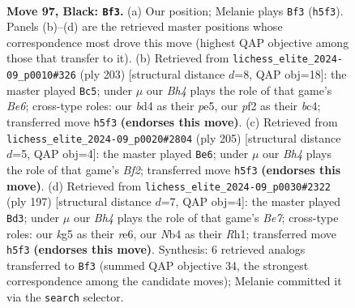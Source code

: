 \documentclass[11pt]{article}
\begin{document}
\clearpage

\begin{figure}[p]\centering
\begin{subfigure}{0.46\textwidth}\centering
\resizebox{\linewidth}{!}{%
\newchessgame
\chessboard[
  setfen={8/7k/8/6Kb/1n1B4/8/5P2/8 b - - 40 97},
  showmover=false,
  pgfstyle=straightmove, color=movearrow, markmove={h5-f3}
]}
\caption{}
\end{subfigure}\hfill
\begin{subfigure}{0.46\textwidth}\centering
\resizebox{\linewidth}{!}{%
\newchessgame
\chessboard[
  setfen={8/4k3/8/4P3/2B1K3/4b3/6P1/8 b - - 4 102},
  showmover=false,
  pgfstyle=straightmove, color=movearrow, markmove={e3-c5}
]}
\caption{}
\end{subfigure}
\\[4pt]
\begin{subfigure}{0.46\textwidth}\centering
\resizebox{\linewidth}{!}{%
\newchessgame
\chessboard[
  setfen={8/5b2/5P2/8/3B4/8/3k4/1K6 b - - 20 103},
  showmover=false,
  pgfstyle=straightmove, color=movearrow, markmove={f7-e6}
]}
\caption{}
\end{subfigure}\hfill
\begin{subfigure}{0.46\textwidth}\centering
\resizebox{\linewidth}{!}{%
\newchessgame
\chessboard[
  setfen={8/8/4R3/P1K3k1/8/2B5/4b3/7r b - - 48 99},
  showmover=false,
  pgfstyle=straightmove, color=movearrow, markmove={e2-d3}
]}
\caption{}
\end{subfigure}
\caption{\textbf{Move 97, Black: \texttt{Bf3}.} (a) Our position; Melanie plays \texttt{Bf3} (\texttt{h5f3}). Panels (b)--(d) are the retrieved master positions whose correspondence most drove this move (highest QAP objective among those that transfer to it). (b) Retrieved from \texttt{lichess\_elite\_2024-09\_p0010\#326} (ply 203) [structural distance $d$=8, QAP obj=18]: the master played \texttt{Bc5}; under $\mu$ our \emph{Bh4} plays the role of that game's \emph{Be6}; cross-type roles: our \emph{b}d4 as their \emph{p}e5, our \emph{p}f2 as their \emph{b}c4; transferred move \texttt{h5f3} \textbf{(endorses this move)}. (c) Retrieved from \texttt{lichess\_elite\_2024-09\_p0020\#2804} (ply 205) [structural distance $d$=5, QAP obj=4]: the master played \texttt{Be6}; under $\mu$ our \emph{Bh4} plays the role of that game's \emph{Bf2}; transferred move \texttt{h5f3} \textbf{(endorses this move)}. (d) Retrieved from \texttt{lichess\_elite\_2024-09\_p0030\#2322} (ply 197) [structural distance $d$=7, QAP obj=4]: the master played \texttt{Bd3}; under $\mu$ our \emph{Bh4} plays the role of that game's \emph{Be7}; cross-type roles: our \emph{k}g5 as their \emph{r}e6, our \emph{N}b4 as their \emph{R}h1; transferred move \texttt{h5f3} \textbf{(endorses this move)}. Synthesis: 6 retrieved analogs transferred to \texttt{Bf3} (summed QAP objective 34, the strongest correspondence among the candidate moves); Melanie committed it via the \texttt{search} selector.}
\label{fig:thought-m193}
\end{figure}
\end{document}

